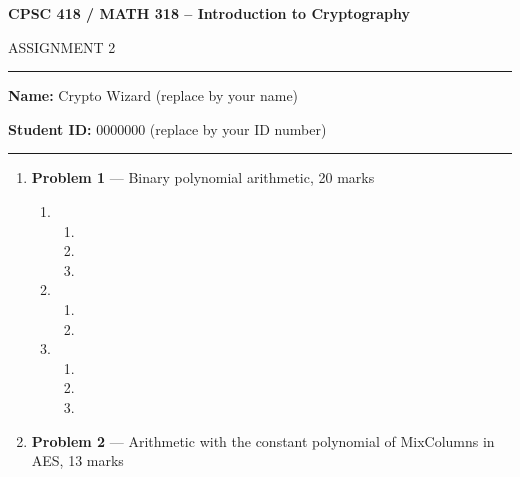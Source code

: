 \documentclass[11pt]{article}
\theoremstyle{definition}
\begin{document}
\begin{center}
{\bf \Large CPSC 418 / MATH 318 -- Introduction to Cryptography

ASSIGNMENT 2}
\end{center}

\hrule 	

\textbf{Name:} Crypto Wizard (replace by your name)

\textbf{Student ID:} 0000000 (replace by your ID number)

\medskip \hrule

\begin{enumerate}

\item[] \textbf{Problem 1} ---  Binary polynomial arithmetic, 20 marks

\begin{enumerate}
\item %

\begin{enumerate}
\item %

\item %

\item %

\end{enumerate}

\item %
		
\begin{enumerate}
\item %

\item %

\end{enumerate}

\item %

\begin{enumerate}

\item %

\item %

\item %
\end{enumerate}
\end{enumerate}


\item[] \textbf{Problem 2} ---  Arithmetic with the constant polynomial of {\sc MixColumns} in
    AES, 13 marks

\begin{enumerate}


\end{enumerate}
\end{enumerate}
\end{document}
